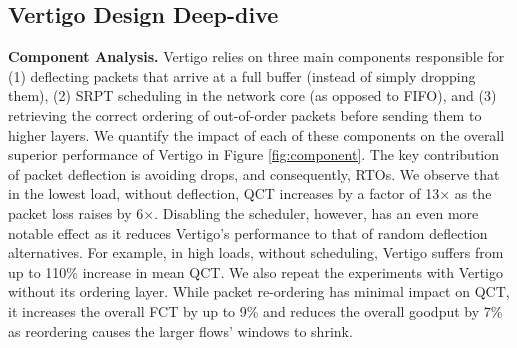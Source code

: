 \subsection{Vertigo Design Deep-dive}
\label{sec:component}
\textbf{Component Analysis.}
Vertigo relies on three main components responsible for (1) deflecting packets that arrive at a full buffer (instead of simply dropping them), (2) SRPT scheduling in the network core (as opposed to FIFO), and (3) retrieving the correct ordering of out-of-order packets before sending them to higher layers.
We quantify the impact of each of these components on the overall superior performance of Vertigo in Figure \ref{fig:component}.
The key contribution of packet deflection is avoiding drops, and consequently, RTOs.
We observe that in the lowest load, without deflection, QCT increases by a factor of 13$\times$ as the packet loss raises by 6$\times$. Disabling the scheduler, however, has an even more notable effect as it reduces Vertigo's performance to that of random deflection alternatives. For example, in high loads, without scheduling, Vertigo suffers from up to 110\% increase in mean QCT. We also repeat the experiments with Vertigo without its ordering layer. While packet re-ordering has minimal impact on QCT, it increases the overall FCT by up to 9\% and reduces the overall goodput by 7\% as reordering causes the larger flows' windows to shrink.


